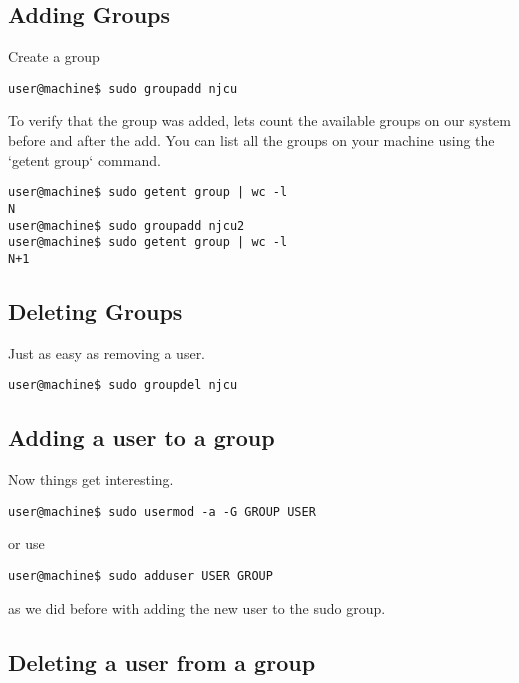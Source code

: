 \documentclass[10pt]{article}
\begin{document}
\subsection{Adding Groups}

Create a group

\begin{lstlisting}[style=term]
user@machine$ sudo groupadd njcu
\end{lstlisting}

To verify that the group was added, lets count the available groups on our system before and after the add.
You can list all the groups on your machine using the `getent group` command.

\begin{lstlisting}[style=term]
user@machine$ sudo getent group | wc -l
N
user@machine$ sudo groupadd njcu2
user@machine$ sudo getent group | wc -l
N+1
\end{lstlisting}

\subsection{Deleting Groups}

Just as easy as removing a user.

\begin{lstlisting}[style=term]
user@machine$ sudo groupdel njcu
\end{lstlisting}

\subsection{ Adding a user to a group }

Now things get interesting.

\begin{lstlisting}[style=term]
user@machine$ sudo usermod -a -G GROUP USER
\end{lstlisting}

or use

\begin{lstlisting}[style=term]
user@machine$ sudo adduser USER GROUP
\end{lstlisting}

as we did before with adding the new user to the sudo group.

\subsection{Deleting a user from a group}
\end{document}
